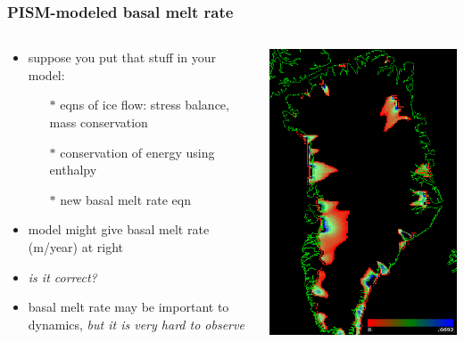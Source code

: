 \documentclass{beamer}
\begin{document}
\begin{frame}
  \frametitle{PISM-modeled basal melt rate}

\begin{columns}
\begin{column}{0.6\textwidth}
\begin{itemize}
\item suppose you put that stuff in your model:
  \begin{itemize}
  \item[$\ast$] eqns of ice flow: stress balance, mass conservation
  \item[$\ast$] conservation of energy using enthalpy
  \item[$\ast$] new basal melt rate eqn
  \end{itemize}
\item model might give basal melt rate (m/year) at right
\item \emph{is it correct?}
\item basal melt rate may be important to dynamics, \emph{but it is very hard to observe}
\end{itemize}
\end{column}
\begin{column}{0.4\textwidth}
\begin{center}
    \includegraphics[width=\textwidth]{bmelt_result}

\end{center}
\end{column}
\end{columns}
\end{frame}
\end{document}
